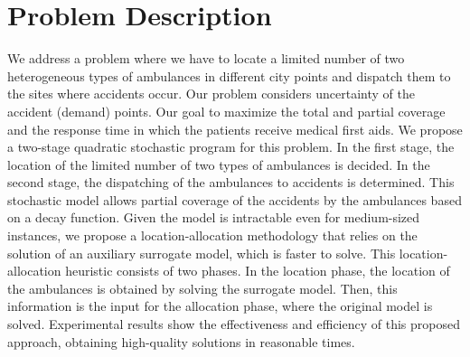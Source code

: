 \section{Problem Description}
We address a problem where we have to locate a limited number of two heterogeneous types of ambulances in different city points and dispatch them to the sites where accidents occur.  Our problem considers uncertainty of the accident (demand) points. Our goal to maximize the total and partial coverage and the response time in which the patients receive medical first aids. We propose a two-stage quadratic stochastic program for this problem. In the first stage, the location of the limited number of two types of ambulances is decided. In the second stage, the dispatching of the ambulances to accidents is determined. This stochastic model allows partial coverage of the accidents by the ambulances based on a decay function. Given the model is intractable even for medium-sized instances, we propose a location-allocation methodology that relies on the solution of an auxiliary surrogate model, which is faster to solve. This location-allocation heuristic consists of two phases.  In the location phase, the location of the ambulances is obtained by solving the surrogate model.  Then, this information is the input for the allocation phase, where the original model is solved. Experimental results show the effectiveness and efficiency of this proposed approach, obtaining high-quality solutions in reasonable times.

